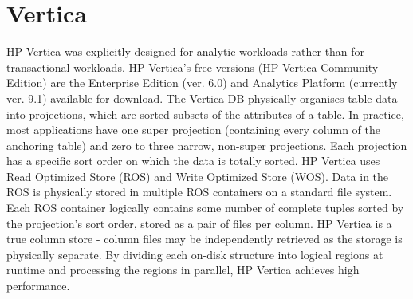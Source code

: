 \section{Vertica}
\label{sec:vertica}

HP Vertica was explicitly designed for analytic workloads rather than for transactional workloads. HP
Vertica’s free versions (HP Vertica Community Edition) are the Enterprise Edition (ver. 6.0) and Analytics Platform
(currently ver. 9.1) available for download.
The Vertica DB physically organises table data into projections, which are sorted subsets of the attributes of a
table. In practice, most applications have one super projection (containing every column of the anchoring
table) and zero to three narrow, non-super projections. Each projection has a specific sort order on which the data
is totally sorted. HP Vertica uses Read Optimized Store (ROS) and Write Optimized Store (WOS). Data in the ROS
is physically stored in multiple ROS containers on a standard file system. Each ROS container logically
contains some number of complete tuples sorted by the projection's sort order, stored as a pair of files per column.
HP Vertica is a true column store - column files may be independently retrieved as the storage is physically
separate. By dividing each on-disk structure into logical regions at runtime and processing the regions in parallel,
HP Vertica achieves high performance. 